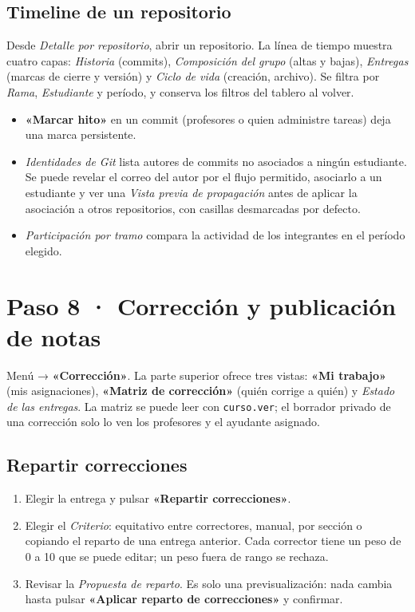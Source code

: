 \documentclass[11pt,a4paper]{article}
\newcommand{\ui}[1]{\textbf{«#1»}}        %
\begin{document}
\subsection{Timeline de un repositorio}

Desde \emph{Detalle por repositorio}, abrir un repositorio. La línea de tiempo muestra cuatro capas: \emph{Historia} (commits), \emph{Composición del grupo} (altas y bajas), \emph{Entregas} (marcas de cierre y versión) y \emph{Ciclo de vida} (creación, archivo). Se filtra por \emph{Rama}, \emph{Estudiante} y período, y conserva los filtros del tablero al volver.

\begin{itemize}
  \item \ui{Marcar hito} en un commit (profesores o quien administre tareas) deja una marca persistente.
  \item \emph{Identidades de Git} lista autores de commits no asociados a ningún estudiante. Se puede revelar el correo del autor por el flujo permitido, asociarlo a un estudiante y ver una \emph{Vista previa de propagación} antes de aplicar la asociación a otros repositorios, con casillas desmarcadas por defecto.
  \item \emph{Participación por tramo} compara la actividad de los integrantes en el período elegido.
\end{itemize}

\section{Paso 8 · Corrección y publicación de notas}

Menú → \ui{Corrección}. La parte superior ofrece tres vistas: \ui{Mi trabajo} (mis asignaciones), \ui{Matriz de corrección} (quién corrige a quién) y \emph{Estado de las entregas}. La matriz se puede leer con \texttt{curso.ver}; el borrador privado de una corrección solo lo ven los profesores y el ayudante asignado.

\subsection{Repartir correcciones}

\begin{enumerate}
  \item Elegir la entrega y pulsar \ui{Repartir correcciones}.
  \item Elegir el \emph{Criterio}: equitativo entre correctores, manual, por sección o copiando el reparto de una entrega anterior. Cada corrector tiene un peso de 0 a 10 que se puede editar; un peso fuera de rango se rechaza.
  \item Revisar la \emph{Propuesta de reparto}. Es solo una previsualización: nada cambia hasta pulsar \ui{Aplicar reparto de correcciones} y confirmar.
\end{enumerate}
\end{document}

